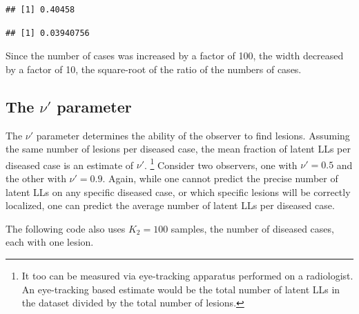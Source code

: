 \documentclass[
]{book}
\newenvironment{Shaded}{\begin{snugshade}}{\end{snugshade}}
\newcommand{\DecValTok}[1]{\textcolor[rgb]{0.00,0.00,0.81}{#1}}
\newcommand{\NormalTok}[1]{#1}
\newcommand{\SpecialCharTok}[1]{\textcolor[rgb]{0.00,0.00,0.00}{#1}}
\begin{document}
\begin{Shaded}
\end{Shaded}

\begin{verbatim}
## [1] 0.40458
\end{verbatim}

\begin{Shaded}
\end{Shaded}

\begin{verbatim}
## [1] 0.03940756
\end{verbatim}

Since the number of cases was increased by a factor of 100, the width decreased by a factor of 10, the square-root of the ratio of the numbers of cases.

\hypertarget{rsm-summary-nu-parameter}{%
\subsection{\texorpdfstring{The \(\nu'\) parameter}{The \textbackslash nu' parameter}}\label{rsm-summary-nu-parameter}}

The \(\nu'\) parameter determines the ability of the observer to find lesions. Assuming the same number of lesions per diseased case, the mean fraction of latent LLs per diseased case is an estimate of \(\nu'\). \footnote{It too can be measured via eye-tracking apparatus performed on a radiologist. An eye-tracking based estimate would be the total number of latent LLs in the dataset divided by the total number of lesions.} Consider two observers, one with \(\nu' = 0.5\) and the other with \(\nu' = 0.9\). Again, while one cannot predict the precise number of latent LLs on any specific diseased case, or which specific lesions will be correctly localized, one can predict the average number of latent LLs per diseased case.

The following code also uses \(K_2 = 100\) samples, the number of diseased cases, each with one lesion.
\end{document}
